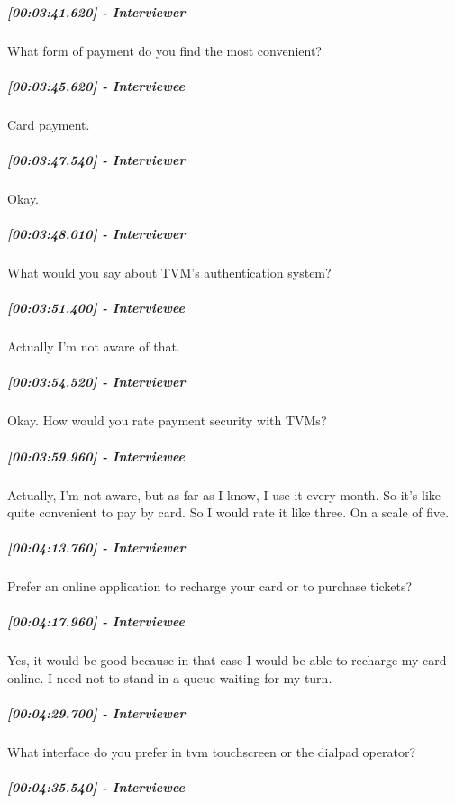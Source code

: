 \documentclass[a4paper,12pt]{article}
\begin{document}
\hypertarget{interviewer-28}{%
\subparagraph{{[}00:03:41.620{]} - Interviewer}\label{interviewer-28}}

What form of payment do you find the most convenient?

\hypertarget{interviewee-18}{%
\subparagraph{{[}00:03:45.620{]} - Interviewee}\label{interviewee-18}}

Card payment.

\hypertarget{interviewer-29}{%
\subparagraph{{[}00:03:47.540{]} - Interviewer}\label{interviewer-29}}

Okay.

\hypertarget{interviewer-30}{%
\subparagraph{{[}00:03:48.010{]} - Interviewer}\label{interviewer-30}}

What would you say about TVM's authentication system?

\hypertarget{interviewee-19}{%
\subparagraph{{[}00:03:51.400{]} - Interviewee}\label{interviewee-19}}

Actually I'm not aware of that.

\hypertarget{interviewer-31}{%
\subparagraph{{[}00:03:54.520{]} - Interviewer}\label{interviewer-31}}

Okay. How would you rate payment security with TVMs?

\hypertarget{interviewee-20}{%
\subparagraph{{[}00:03:59.960{]} - Interviewee}\label{interviewee-20}}

Actually, I'm not aware, but as far as I know, I use it every month. So
it's like quite convenient to pay by card. So I would rate it like
three. On a scale of five.

\hypertarget{interviewer-32}{%
\subparagraph{{[}00:04:13.760{]} - Interviewer}\label{interviewer-32}}

Prefer an online application to recharge your card or to purchase
tickets?

\hypertarget{interviewee-21}{%
\subparagraph{{[}00:04:17.960{]} - Interviewee}\label{interviewee-21}}

Yes, it would be good because in that case I would be able to recharge
my card online. I need not to stand in a queue waiting for my turn.

\hypertarget{interviewer-33}{%
\subparagraph{{[}00:04:29.700{]} - Interviewer}\label{interviewer-33}}

What interface do you prefer in tvm touchscreen or the dialpad operator?

\hypertarget{interviewee-22}{%
\subparagraph{{[}00:04:35.540{]} - Interviewee}\label{interviewee-22}}
\end{document}
